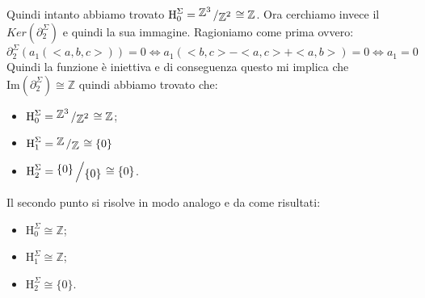 \documentclass[11pt, a4paper, twoside]{article}
\newcommand{\bigslant}[2]{{\raisebox{.2em}{$#1$}\left/\raisebox{-.2em}{$#2$}\right.}}
\begin{document}
\begin{sol}
	Quindi intanto abbiamo trovato $\text{H}_0^\Sigma=\bigslant{\mathbb{Z}^3}{\mathbb{Z}^2}\cong\mathbb{Z}$.
	Ora cerchiamo invece il $Ker(\partial^\Sigma_2)$ e quindi la sua immagine.
	Ragioniamo come prima ovvero: 
	\[
		\partial^\Sigma_2(a_1(<a,b,c>))=0\iff a_1(<b,c>-<a,c>+<a,b>)=0 \iff a_1=0
	\]
	Quindi la funzione è iniettiva e di conseguenza questo mi implica che $\text{Im}(\partial^\Sigma_2)\cong\mathbb{Z}$ quindi abbiamo trovato che:
	\begin{itemize}
		\item $\text{H}_0^\Sigma=\bigslant{\mathbb{Z}^3}{\mathbb{Z}^2}\cong\mathbb{Z}$;
		\item $\text{H}_1^\Sigma=\bigslant{\mathbb{Z}}{\mathbb{Z}}\cong\{0\}$
		\item $\text{H}_2^\Sigma=\bigslant{\{0\}}{\{0\}}\cong\{0\}$.
	\end{itemize}
	Il secondo punto si risolve in modo analogo e da come risultati:
	\begin{itemize}
		\item $\text{H}_0^\Sigma\cong\mathbb{Z}$;
		\item $\text{H}_1^\Sigma\cong\mathbb{Z}$;
		\item $\text{H}_2^\Sigma\cong\{0\}$.
	\end{itemize}
\end{sol}
\end{document}

